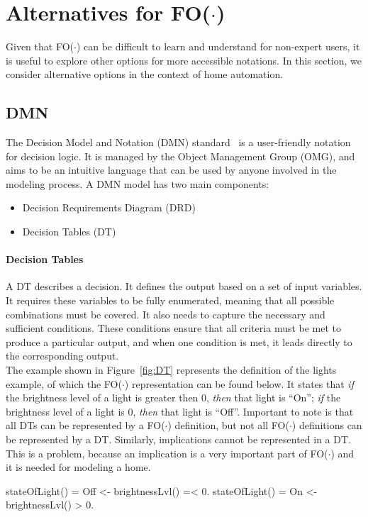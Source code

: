 \documentclass[11pt,a4paper]{report}
\newcommand{\fodot}{FO($\cdot$)\xspace}
\begin{document}
\section{Alternatives for \fodot}
Given that \fodot can be difficult to learn and understand for non-expert users, it is useful to explore other options for more accessible notations. In this section, we consider alternative options in the context of home automation.

\subsection{DMN}
The Decision Model and Notation (DMN) standard~\cite{DMN} is a user-friendly notation for decision logic. It is managed by the Object Management Group (OMG), and aims to be an intuitive language that can be used by anyone involved in the modeling process. A DMN model has two main components:
\begin{itemize}
	\item Decision Requirements Diagram (DRD)
    \item Decision Tables (DT)
\end{itemize}

\paragraph{Decision Tables}
A DT describes a decision. It defines the output based on a set of input variables. It requires these variables to be fully enumerated, meaning that all possible combinations must be covered. It also needs to capture the necessary and sufficient conditions. These conditions ensure that all criteria must be met to produce a particular output, and when one condition is met, it leads directly to the corresponding output.\\
The example shown in Figure~\ref{fig:DT} represents the definition of the lights example, of which the \fodot representation can be found below. It states that \textit{if} the brightness level of a light is greater then 0, \textit{then} that light is ``On''; \textit{if} the brightness level of a light is 0, \textit{then} that light is ``Off''. Important to note is that all DTs can be represented by a \fodot definition, but not all \fodot definitions can be represented by a DT. Similarly, implications cannot be represented in a DT. This is a problem, because an implication is a very important part of \fodot and it is needed for modeling a home.

\begin{idplisting}
{
   stateOfLight() = Off <- brightnessLvl() =< 0.
   stateOfLight() = On <- brightnessLvl() > 0.
}
\end{idplisting}
\end{document}
